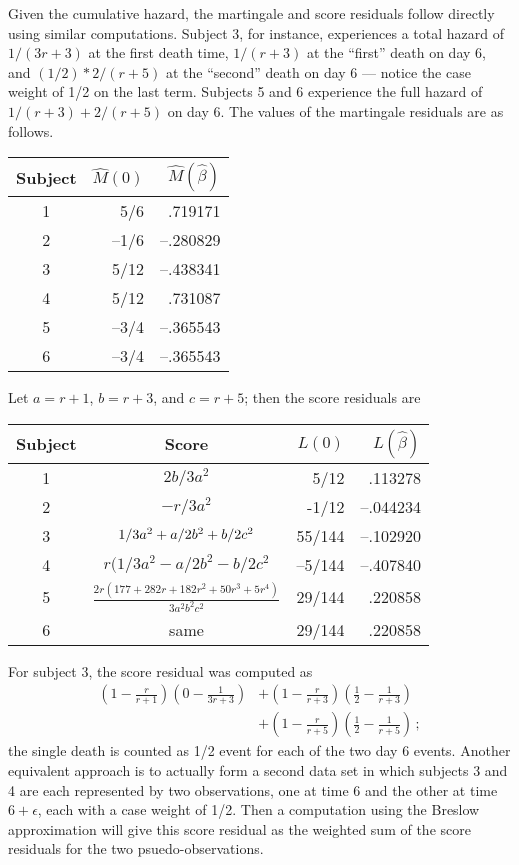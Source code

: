 \documentclass[11pt]{article}
\def\bhat{\hat \beta}        %
\def\Mhat{\widehat M}        %
\begin{document}
Given the cumulative hazard, the martingale and score residuals
follow directly using similar computations.
Subject 3, for instance, experiences a total hazard of
$1/(3r+3)$ at the first death time, $1/(r+3)$ at the ``first'' death on
day 6, and $(1/2)*2/(r+5)$ at the ``second'' death on day 6
--- notice the case weight of 1/2 on the last term.
Subjects 5 and 6 experience the full hazard of $1/(r+3) + 2/(r+5)$ 
on day 6.
The values of the 
martingale residuals are as follows.
\begin{center}
\begin{tabular}{c|rr}
Subject& $\Mhat(0)$ & $\Mhat(\bhat)$\\ \hline
1&  5/6 & .719171 \\
2&  --1/6& --.280829 \\
3& 5/12 & --.438341  \\
4& 5/12 & .731087  \\
5& --3/4 & --.365543 \\
6 &--3/4 & --.365543 \\
\end{tabular}
\end{center}
Let $a= r+1$, $b= r+3$, and $c=r+5$; then the score residuals are
\begin{center}
\begin{tabular}{c|crr}
Subject& Score& $L(0)$ & $L(\bhat)$ \\ \hline
1& $2b/3a^2$& 5/12 & .113278 \\
2&  $-r/3a^2$& -1/12& --.044234 \\
3&  $\-1/3a^2 + a/2b^2 + b/2c^2$&
		 55/144& --.102920 \\
4&  $r(1/3a^2 - a/2b^2 - b/2c^2$
		&--5/144& --.407840\\
5&  $\frac{2r(177 + 282r + 182r^2 + 50r^3 + 5r^4)}{3a^2 b^2 c^2}$
 		& 29/144&  .220858\\
6 & same & 29/144& .220858
\end{tabular}
\end{center}

For subject 3, the score residual was computed as
$$
\begin{array}{rl}
\left(1-\frac{r}{r+1}\right)\left(0-\frac{1}{3r+3}\right) & +
\left(1-\frac{r}{r+3}\right)\left(\frac{1}{2}-\frac{1}{r+3}\right)\\ & +
\left(1-\frac{r}{r+5}\right)\left(\frac{1}{2}-\frac{1}{r+5}\right) \,;
\end{array}
$$
the single death is counted as 1/2 event for each of the two day 6 events.
Another equivalent approach is to actually form a second
data set in which subjects 3 and 4 are each represented by
two observations, one at time 6 and the other at time $6+\epsilon$,
each with a case weight of 1/2.
Then a computation using the Breslow approximation will give
this score residual as the weighted sum of the score residuals
for the two psuedo-observations.
\end{document}
